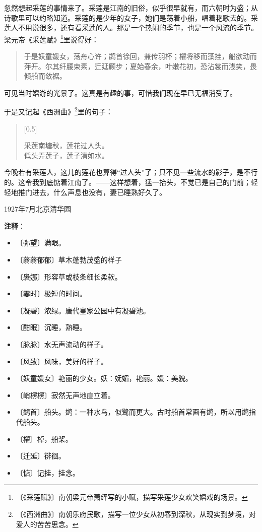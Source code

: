 \documentclass[12pt,UTF-8,openany]{ctexbook}
\begin{document}
\begin{normalsize}
    忽然想起采莲的事情来了。采莲是江南的旧俗，似乎很早就有，而六朝时为盛；从诗歌里可以约略知道。采莲的是少年的女子，她们是荡着小船，唱着艳歌去的。采莲人不用说很多，还有看采莲的人。那是一个热闹的季节，也是一个风流的季节。梁元帝《采莲赋》\footnote{〔《采莲赋》〕南朝梁元帝萧绎写的小赋，描写采莲少女欢笑嬉戏的场景。}里说得好：
    
    \begin{quotation}
    
    于是妖童媛女，荡舟心许；鹢首徐回，兼传羽杯；櫂将移而藻挂，船欲动而萍开。尔其纤腰束素，迁延顾步；夏始春余，叶嫩花初，恐沾裳而浅笑，畏倾船而敛裾。
    
    \end{quotation}
    
    可见当时嬉游的光景了。这真是有趣的事，可惜我们现在早已无福消受了。
    
    于是又记起《西洲曲》\footnote{〔《西洲曲》〕南朝乐府民歌，描写一位少女从初春到深秋，从现实到梦境，对爱人的苦苦思念。}里的句子：
    
    \begin{verse}[0.5\linewidth]
    
    采莲南塘秋，莲花过人头。\\低头弄莲子，莲子清如水。
    
    \end{verse}
    
    今晚若有采莲人，这儿的莲花也算得“过人头”了；只不见一些流水的影子，是不行的。这令我到底惦着江南了。——这样想着，猛一抬头，不觉已是自己的门前；轻轻地推门进去，什么声息也没有，妻已睡熟好久了。
    
    \hfill 1927年7月北京清华园
    
\end{normalsize}


\newpage

\textbf{注释}：

\vspace{-1em}

\begin{itemize}
    \setlength\itemsep{-0.2em}
    \item 〔弥望〕满眼。
    \item 〔蓊蓊郁郁〕草木蓬勃茂盛的样子
    \item 〔袅娜〕形容草或枝条细长柔软。
    \item 〔霎时〕极短的时间。
    \item 〔凝碧〕浓绿。唐代皇家公园中有凝碧池。
    \item 〔酣眠〕沉睡，熟睡。
    \item 〔脉脉〕水无声流动的样子。
    \item 〔风致〕风味，美好的样子。
    \item 〔妖童媛女〕艳丽的少女。妖：妩媚，艳丽。媛：美貌。
    \item 〔峭楞楞〕寂然无声地直立着。
    \item 〔鹢首〕船头。鹢：一种水鸟，似鹭而更大。古时船首常画有鹢，所以用鹢指代船头。
    \item 〔櫂〕棹，船桨。
    \item 〔迁延〕徘徊。
    \item 〔惦〕记挂，挂念。
\end{itemize}
\end{document}
